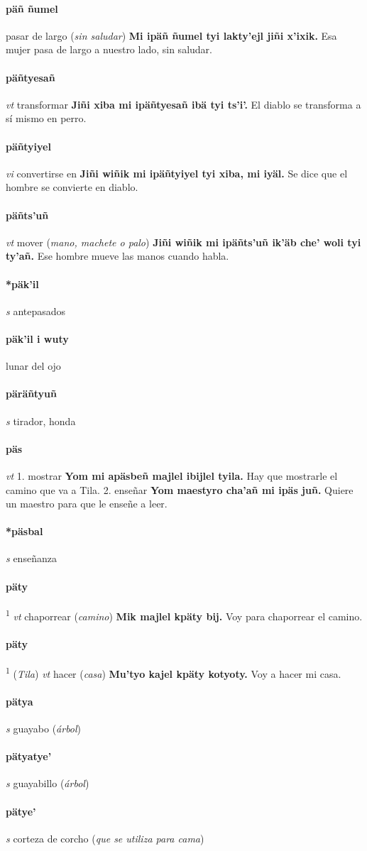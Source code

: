 \documentclass{scrbook}
\newcommand{\entry}[1]{\paragraph{#1}}
\newcommand{\onedefinition}[1]{#1.}
\newcommand{\defsuperscript}[1]{\textsuperscript{1}}
\newcommand{\partofspeech}[1]{\textit{#1}}
\newcommand{\spanishtranslation}[1]{#1}
\newcommand{\clarification}[1]{(\textit{#1})}
\newcommand{\cholexample}[1]{\textbf{#1}}
\newcommand{\exampletranslation}[1]{#1}
\newcommand{\relevantdialect}[1]{(\textit{#1})}
\begin{document}
\begin{multicols}{2}
\entry{päñ ñumel}
\spanishtranslation{pasar de largo}
\clarification{sin saludar}
\cholexample{Mi ipäñ ñumel tyi lakty'ejl jiñi x'ixik.}
\exampletranslation{Esa mujer pasa de largo a nuestro lado, sin saludar.}

\entry{päñtyesañ}
\partofspeech{vt}
\spanishtranslation{transformar}
\cholexample{Jiñi xiba mi ipäñtyesañ ibä tyi ts'i'.}
\exampletranslation{El diablo se transforma a sí mismo en perro.}

\entry{päñtyiyel}
\partofspeech{vi}
\spanishtranslation{convertirse en}
\cholexample{Jiñi wiñik mi ipäñtyiyel tyi xiba, mi iyäl.}
\exampletranslation{Se dice que el hombre se convierte en diablo.}

\entry{päñts'uñ}
\partofspeech{vt}
\spanishtranslation{mover}
\clarification{mano, machete o palo}
\cholexample{Jiñi wiñik mi ipäñts'uñ ik'äb che' woli tyi ty'añ.}
\exampletranslation{Ese hombre mueve las manos cuando habla.}

\entry{*päk'il}
\partofspeech{s}
\spanishtranslation{antepasados}

\entry{päk'il i wuty}
\spanishtranslation{lunar del ojo}

\entry{päräñtyuñ}
\partofspeech{s}
\spanishtranslation{tirador, honda}

\entry{päs}
\partofspeech{vt}
\onedefinition{1}
\spanishtranslation{mostrar}
\cholexample{Yom mi apäsbeñ majlel ibijlel tyila.}
\exampletranslation{Hay que mostrarle el camino que va a Tila.}
\onedefinition{2}
\spanishtranslation{enseñar}
\cholexample{Yom maestyro cha'añ mi ipäs juñ.}
\exampletranslation{Quiere un maestro para que le enseñe a leer.}

\entry{*päsbal}
\partofspeech{s}
\spanishtranslation{enseñanza}

\entry{päty}
\defsuperscript{1}
\partofspeech{vt}
\spanishtranslation{chaporrear}
\clarification{camino}
\cholexample{Mik majlel kpäty bij.}
\exampletranslation{Voy para chaporrear el camino.}

\entry{päty}
\defsuperscript{2}
\relevantdialect{Tila}
\partofspeech{vt}
\spanishtranslation{hacer}
\clarification{casa}
\cholexample{Mu'tyo kajel kpäty kotyoty.}
\exampletranslation{Voy a hacer mi casa.}

\entry{pätya}
\partofspeech{s}
\spanishtranslation{guayabo}
\clarification{árbol}

\entry{pätyatye'}
\partofspeech{s}
\spanishtranslation{guayabillo}
\clarification{árbol}

\entry{pätye'}
\partofspeech{s}
\spanishtranslation{corteza de corcho}
\clarification{que se utiliza para cama}


\end{multicols}
\end{document}
